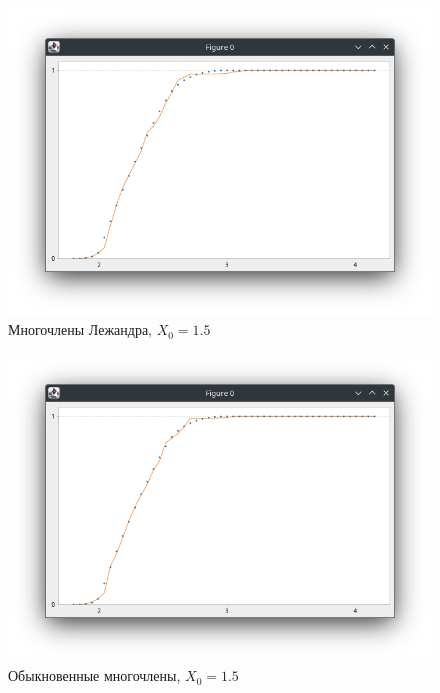 \documentclass[a4paper,14pt]{extarticle}
\begin{document}
    \begin{figure}[h]
        \centering
        \includegraphics[scale=0.5]{images/lege15}
        \caption{Многочлены Лежандра, $X_0 = 1.5$}
    \end{figure}


    \begin{figure}[h]
        \centering
        \includegraphics[scale=0.5]{images/poly15}
        \caption{Обыкновенные многочлены, $X_0 = 1.5$}
    \end{figure}

    \newpage
\end{document}
